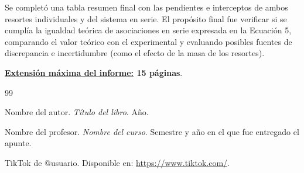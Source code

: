 \documentclass[12pt,a4paper]{article}
\begin{document}
 Se completó una tabla resumen final con las pendientes e interceptos de ambos resortes individuales y del sistema en serie. El propósito final fue verificar si se cumplía la igualdad teórica de asociaciones en serie expresada en la Ecuación 5, comparando el valor teórico con el experimental y evaluando posibles fuentes de discrepancia e incertidumbre (como el efecto de la masa de los resortes).

\textbf{\underline{Extensión máxima del informe:} 15 páginas}.

\begin{thebibliography}{99}

 Nombre del autor. \textit{Título del libro}. Año.

 Nombre del profesor. \textit{Nombre del curso}. Semestre y año en el que fue entregado el apunte.

 TikTok de @usuario. Disponible en: \url{https://www.tiktok.com/}.

\end{thebibliography}
\end{document}
